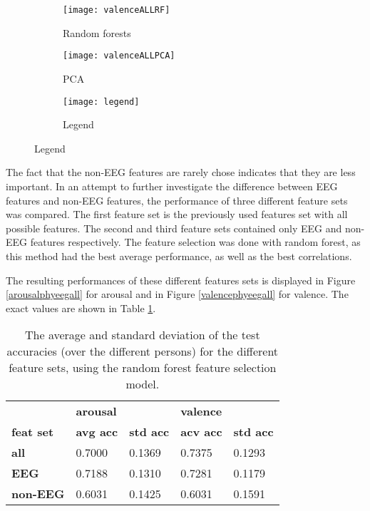 \begin{figure}[!tbp]
  \begin{subfigure}[b]{0.3\textwidth}
    \texttt{[image: valenceALLRF]}
    \caption{Random forests}
  \end{subfigure}
  \hfill
  \begin{subfigure}[b]{0.3\textwidth}
    \texttt{[image: valenceALLPCA]}
    \caption{PCA}
  \end{subfigure}
  \hfill
  \begin{subfigure}[b]{0.3\textwidth}
    \texttt{[image: legend]}
    \caption{Legend\label{valencepieslegend}}
  \end{subfigure}
\end{figure}
\clearpage

The fact that the non-EEG features are rarely chose indicates that they are less important. In an attempt to further investigate the difference between EEG features and non-EEG features, the performance of three different feature sets was compared. The first feature set is the previously used features set with all possible features. The second and third feature sets contained only EEG and non-EEG features respectively. The feature selection was done with random forest, as this method had the best average performance, as well as the best correlations. 

\npar

The resulting performances of these different features sets is displayed in Figure \ref{arousalphyeegall} for arousal and in Figure \ref{valencephyeegall} for valence. The exact values are shown in Table \ref{phyeegalltable}.



\begin{table}[H]
\centering
\begin{tabular}{l|ll|ll}
         & \textbf{arousal} &         & \textbf{valence} &         \\
\textbf{feat set} & \textbf{avg acc} & \textbf{std acc} & \textbf{acv acc} & \textbf{std acc} \\
\textbf{all}      & 0.7000  & 0.1369  & 0.7375  & 0.1293  \\
\textbf{EEG}      & 0.7188  & 0.1310  & 0.7281  & 0.1179  \\
\textbf{non-EEG}  & 0.6031  & 0.1425  & 0.6031  & 0.1591 
\end{tabular}
\caption{The average and standard deviation of the test accuracies (over the different persons) for the different feature sets, using the random forest feature selection model.\label{phyeegalltable}}
\end{table}

